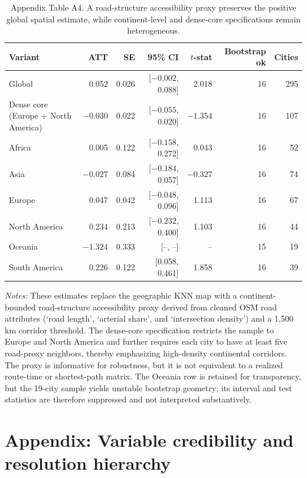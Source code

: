 \documentclass[11pt,a4paper]{article}
\begin{document}
\begin{table}[H]
\centering
\caption{Appendix Table A4. A road-structure accessibility proxy preserves the positive global spatial estimate, while continent-level and dense-core specifications remain heterogeneous.}
\label{tab:road_proxy_appendix}
\small
\setlength{\tabcolsep}{4pt}
\begin{tabular}{lrrrrrr}
\toprule
Variant & ATT & SE & 95\% CI & $t$-stat & Bootstrap ok & Cities \\
\midrule
Global & 0.052 & 0.026 & [$-0.002$, 0.088] & 2.018 & 16 & 295 \\
Dense core (Europe + North America) & $-0.030$ & 0.022 & [$-0.055$, 0.020] & $-1.354$ & 16 & 107 \\
Africa & 0.005 & 0.122 & [$-0.158$, 0.272] & 0.043 & 16 & 52 \\
Asia & $-0.027$ & 0.084 & [$-0.184$, 0.057] & $-0.327$ & 16 & 74 \\
Europe & 0.047 & 0.042 & [$-0.048$, 0.096] & 1.113 & 16 & 67 \\
North America & 0.234 & 0.213 & [$-0.232$, 0.400] & 1.103 & 16 & 44 \\
Oceania & $-1.324$ & 0.333 & [--, --] & -- & 15 & 19 \\
South America & 0.226 & 0.122 & [0.058, 0.461] & 1.858 & 16 & 39 \\
\bottomrule
\end{tabular}
\end{table}
\FloatBarrier

\noindent\textit{Notes:} These estimates replace the geographic KNN map with a continent-bounded road-structure accessibility proxy derived from cleaned OSM road attributes (`road length', `arterial share', and `intersection density') and a 1,500 km corridor threshold. The dense-core specification restricts the sample to Europe and North America and further requires each city to have at least five road-proxy neighbors, thereby emphasizing high-density continental corridors. The proxy is informative for robustness, but it is not equivalent to a realized route-time or shortest-path matrix. The Oceania row is retained for transparency, but the 19-city sample yields unstable bootstrap geometry; its interval and test statistics are therefore suppressed and not interpreted substantively.

\section{Appendix: Variable credibility and resolution hierarchy}
\label{app:variable_credibility}
\end{document}

